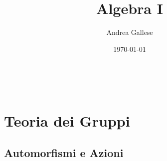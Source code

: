 \documentclass[a4paper]{article}
\title{Algebra I}\let\Title\@title
\author{Andrea Gallese}\let\Author\@author
\date{\today}\let\Date\@date
\theoremstyle{remark}
\theoremstyle{definition}
\begin{document}
\begin{center}
	\vspace*{0,5 cm}
	{\Huge \textsc{\Title}} \\
	\vspace{0,5 cm}
	\textsc{\Author} \hspace{1cm} \textsc{\Date}
	\thispagestyle{empty}
	\vspace{0,7 cm}
\end{center}
\small

\setcounter{section}{6} %
\section{Teoria dei Gruppi}
\subsection{Automorfismi e Azioni}
\end{document}
